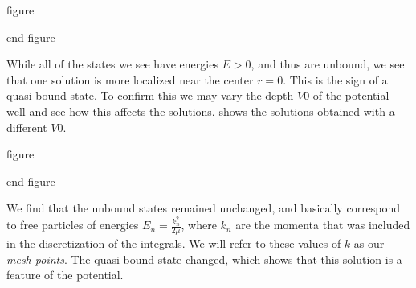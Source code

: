 {figure}

\label{fig:momspace solutions}
{end figure}

 While all of the states we see have energies $E>0$, and thus are unbound, we see that one solution is more localized near the center $r=0$. This is the sign of a quasi-bound state. To confirm this we may vary the depth $V0$ of the potential well and see how this affects the solutions.  shows the solutions obtained with a different $V0$.

{figure}

\label{fig:momspace solutions var}
{end figure}

We find that the unbound states remained unchanged, and basically correspond to free particles of energies $E_n=\frac{k_n^2}{2\mu}$, where $k_n$ are the momenta that was included in the discretization of the integrals. We will refer to these values of $k$ as our \emph{mesh points}. The quasi-bound state changed, which shows that this solution is a feature of the potential.  

